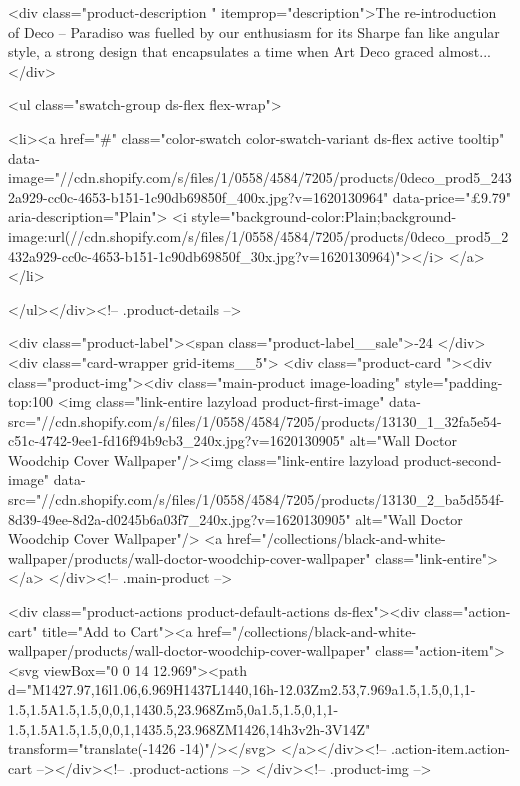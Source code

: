 {{{{{{{<div class="product-description " itemprop="description">The re-introduction of Deco – Paradiso was fuelled by our enthusiasm for its Sharpe fan like angular style, a strong design that encapsulates a time when Art Deco graced almost...
</div>



<ul class="swatch-group ds-flex flex-wrap">
        
<li><a href="#" class="color-swatch color-swatch-variant ds-flex active tooltip" data-image="//cdn.shopify.com/s/files/1/0558/4584/7205/products/0deco_prod5_2432a929-cc0c-4653-b151-1c90db69850f_400x.jpg?v=1620130964" data-price="£9.79" aria-description="Plain">
              <i style="background-color:Plain;background-image:url(//cdn.shopify.com/s/files/1/0558/4584/7205/products/0deco_prod5_2432a929-cc0c-4653-b151-1c90db69850f_30x.jpg?v=1620130964)"></i>
            </a></li>

      </ul></div><!-- .product-details -->

<div class="product-label"><span class="product-label__sale">-24%
          </div><div class="card-wrapper grid-items__5">
            <div class="product-card "><div class="product-img"><div class="main-product image-loading" style="padding-top:100%
      <img class="link-entire lazyload product-first-image" data-src="//cdn.shopify.com/s/files/1/0558/4584/7205/products/13130_1_32fa5e54-c51c-4742-9ee1-fd16f94b9cb3_240x.jpg?v=1620130905" alt="Wall Doctor Woodchip Cover Wallpaper"/><img class="link-entire lazyload product-second-image" data-src="//cdn.shopify.com/s/files/1/0558/4584/7205/products/13130_2_ba5d554f-8d39-49ee-8d2a-d0245b6a03f7_240x.jpg?v=1620130905" alt="Wall Doctor Woodchip Cover Wallpaper"/>
      <a href="/collections/black-and-white-wallpaper/products/wall-doctor-woodchip-cover-wallpaper" class="link-entire"></a>
    </div><!-- .main-product -->
  
<div class="product-actions product-default-actions ds-flex"><div class="action-cart" title="Add to Cart"><a href="/collections/black-and-white-wallpaper/products/wall-doctor-woodchip-cover-wallpaper" class="action-item"><svg viewBox="0 0 14 12.969"><path d="M1427.97,16l1.06,6.969H1437L1440,16h-12.03Zm2.53,7.969a1.5,1.5,0,1,1-1.5,1.5A1.5,1.5,0,0,1,1430.5,23.968Zm5,0a1.5,1.5,0,1,1-1.5,1.5A1.5,1.5,0,0,1,1435.5,23.968ZM1426,14h3v2h-3V14Z" transform="translate(-1426 -14)"/></svg>
</a></div><!-- .action-item.action-cart --></div><!-- .product-actions -->
</div><!-- .product-img -->

}}}}}}}
